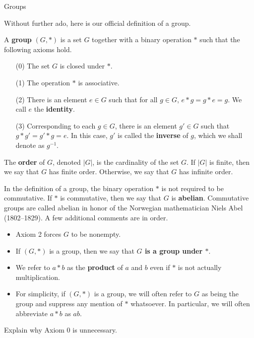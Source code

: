 \begin{section}{Groups}


Without further ado, here is our official definition of a group.

\begin{definition}\label{def:group}
A \textbf{group} $(G,*)$ is a set $G$ together with a binary operation $*$ such that the following axioms hold.
\begin{enumerate}
\item[(0)] The set $G$ is closed under $*$.
\item[(1)] The operation $*$ is associative.
\item[(2)] There is an element $e\in G$ such that for all $g\in G$, $e*g=g*e=g$.  We call $e$ the \textbf{identity}.
\item[(3)] Corresponding to each $g\in G$, there is an element $g'\in G$ such that $g*g'=g'*g=e$.  In this case, $g'$ is called the \textbf{inverse} of $g$, which we shall denote as $g^{-1}$.
\end{enumerate}
The \textbf{order} of $G$, denoted $|G|$, is the cardinality of the set $G$. If $|G|$ is finite, then we say that $G$ has finite order. Otherwise, we say that $G$ has infinite order.
\end{definition}

In the definition of a group, the binary operation $*$ is not required to be commutative.  If $*$ is commutative, then we say that $G$ is \textbf{abelian}. Commutative groups are called abelian in honor of the Norwegian mathematician Niels Abel (1802--1829). A few additional comments are in order.
\begin{itemize}
\item Axiom 2 forces $G$ to be nonempty.
\item If $(G,*)$ is a group, then we say that \textbf{$G$ is a group under $*$}.
\item We refer to $a*b$ as the \textbf{product} of $a$ and $b$ even if $*$ is not actually multiplication. 
\item For simplicity, if $(G,*)$ is a group, we will often refer to $G$ as being the group and suppress any mention of $*$ whatsoever.  In particular, we will often abbreviate $a*b$ as $ab$. 
\end{itemize}

\begin{problem}
Explain why Axiom 0 is unnecessary.
\end{problem}


\end{section}
